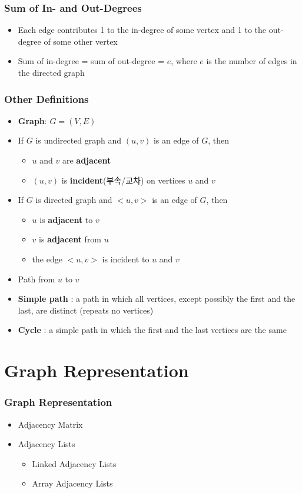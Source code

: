 \documentclass[newPxFont,sthlmFooter,nooffset]{beamer}
\begin{document}
\begin{frame}[t]
  \frametitle{Sum of In- and Out-Degrees}
  \begin{itemize}
  \item Each edge contributes 1 to the in-degree of some vertex and 1 to the out-degree of some other vertex
  \item Sum of in-degree = sum of out-degree = $e$, where $e$ is the number of edges in the directed graph
  \end{itemize}
\end{frame}


\begin{frame}[t]
  \frametitle{Other Definitions}
  \begin{itemize}
  \item \textbf{Graph}: $G=(V,E)$
  \item  If $G$ is undirected graph and $(u,v)$ is an edge of $G$, then
    \begin{itemize}
    \item $u$ and $v$ are \textbf{adjacent}
    \item $(u,v)$ is \textbf{incident}(부속/교차) on vertices $u$ and $v$
    \end{itemize}

\item If $G$ is directed graph and $<u,v>$ is an edge of $G$, then
  \begin{itemize}
  \item $u$ is \textbf{adjacent} to $v$
  \item $v$ is \textbf{adjacent} from $u$
  \item the edge $<u, v>$ is incident to $u$ and $v$
  \end{itemize}

\item Path from $u$ to $v$
\item \textbf{Simple path} : a path in which all vertices, except
  possibly the first and the last, are distinct (repeats no vertices)
\item \textbf{Cycle} : a simple path in which the first and the last
  vertices are the same
  \end{itemize}
\end{frame}

\section{Graph Representation}
\begin{frame}[t]
  \frametitle{Graph Representation}
  \begin{itemize}
  \item Adjacency Matrix
  \item Adjacency Lists
    \begin{itemize}
    \item Linked Adjacency Lists
    \item Array Adjacency Lists
    \end{itemize}
  \end{itemize}
\end{frame}
\end{document}
